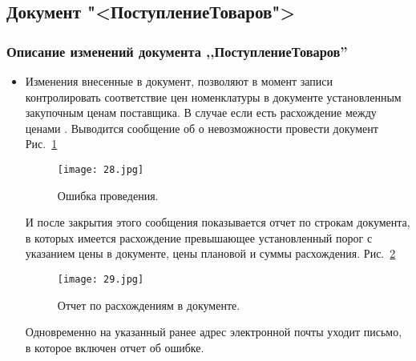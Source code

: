 \subsection{Документ  "<ПоступлениеТоваров">}
\subsubsection{Описание изменений документа ,,ПоступлениеТоваров''}
\begin{itemize}	
	\item Изменения внесенные в документ, позволяют в момент записи контролировать соответствие цен номенклатуры в документе установленным закупочным ценам поставщика. В случае если есть расхождение между ценами
		. Выводится сообщение об о невозможности провести документ Рис.~\ref{ris:28.jpg}
	\begin{figure}[H]
		\texttt{[image: 28.jpg]}
		\caption{Ошибка проведения.}
		\label{ris:28.jpg}
	\end{figure}
	И после закрытия этого сообщения показывается отчет по строкам документа, в которых имеется расхождение превышающее установленный порог с указанием цены в документе, цены плановой и суммы расхождения. Рис.~\ref{ris:29.jpg}
	\begin{figure}[H]
		\texttt{[image: 29.jpg]}
		\caption{Отчет по расхождениям в документе.}
		\label{ris:29.jpg}
	\end{figure}
	Одновременно на указанный ранее адрес электронной почты уходит письмо, в которое включен отчет об ошибке.
\end{itemize}
